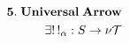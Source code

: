 \documentclass[preview]{standalone}
\begin{document}
\begin{align*}
\special{dvisvgm:raw <g id='unique000'>}\mathbf{5.\;Universal\;Arrow}\\\exists!\, !_\alpha: S\to\nu\mathcal{T}\special{dvisvgm:raw </g>}
\end{align*}
\end{document}
